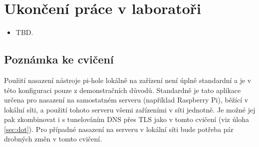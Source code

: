 \section{Ukončení práce v laboratoři}
\begin{itemize}
  \item TBD.
\end{itemize}

\subsection{Poznámka ke cvičení}
Použití nasazení nástroje pi-hole lokálně na zařízení není úplně standardní a je v této konfiguraci pouze z demonstračních důvodů. Standardně je tato aplikace určena pro nasazení na samostatném serveru (například Raspberry Pi), běžící v lokální síti, a použití tohoto serveru všemi zařízeními v síti jednotně. Je možné jej pak zkombinovat i s tunelováním DNS přes TLS jako v tomto cvičení (viz úloha \ref{sec:dot}). Pro případné nasazení na serveru v lokální síti bude potřeba pár drobných změn v tomto cvičení.

